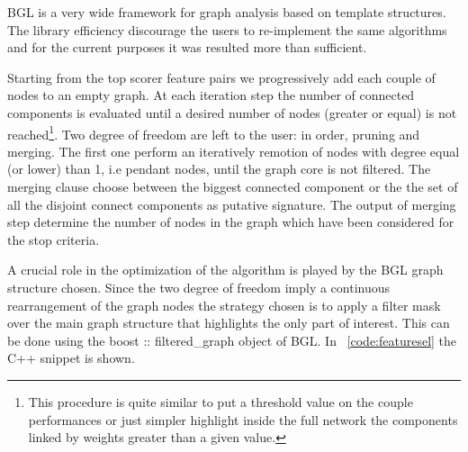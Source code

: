 \documentclass{standalone}
\begin{document}
BGL is a very wide framework for graph analysis based on template structures.
The library efficiency discourage the users to re-implement the same algorithms and for the current purposes it was resulted more than sufficient.

Starting from the top scorer feature pairs we progressively add each couple of nodes to an empty graph.
At each iteration step the number of connected components is evaluated until a desired number of nodes (greater or equal) is not reached\footnote{
  This procedure is quite similar to put a threshold value on the couple performances or just simpler highlight inside the full network the components linked by weights greater than a given value.
}.
Two degree of freedom are left to the user: in order, \textsf{pruning} and \textsf{merging}.
The first one perform an iteratively remotion of nodes with degree equal (or lower) than 1, i.e pendant nodes, until the graph core is not filtered.
The \textsf{merging} clause choose between the biggest connected component or the the set of all the disjoint connect components as putative signature.
The output of \textsf{merging} step determine the number of nodes in the graph which have been considered for the stop criteria.

A crucial role in the optimization of the algorithm is played by the BGL graph structure chosen.
Since the two degree of freedom imply a continuous rearrangement of the graph nodes the strategy chosen is to apply a filter mask over the main graph structure that highlights the only part of interest.
This can be done using the \textsf{boost :: filtered\_graph} object of BGL.
In ~\ref{code:featuresel} the C++ snippet is shown.
\end{document}
